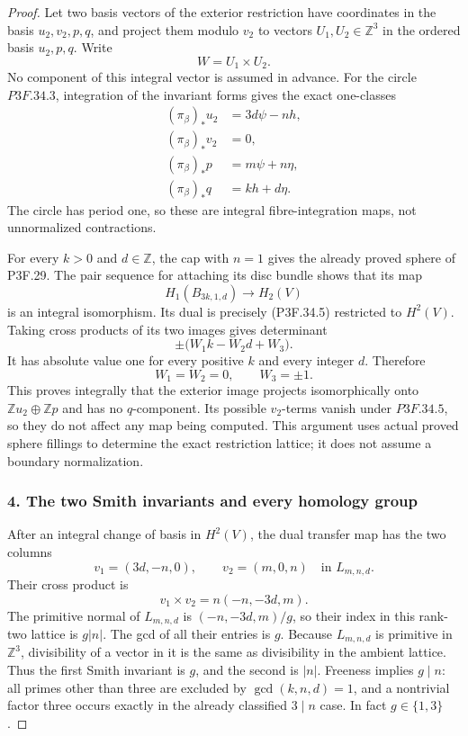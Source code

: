 \begin{proof}
Let two basis vectors of the exterior restriction have coordinates in the basis \(u_2,v_2,p,q\), and project them modulo \(v_2\) to vectors \(U_1,U_2\in\mathbb Z^3\) in the ordered basis \(u_2,p,q\). Write \[
                       W=U_1\times U_2.
\] No component of this integral vector is assumed in advance. For the circle \(P3F.34.3\), integration of the invariant forms gives the exact one-classes \[
 \begin{aligned}
 (\pi_\beta)_*u_2&=3d\psi-nh,\\
 (\pi_\beta)_*v_2&=0,\\
 (\pi_\beta)_*p&=m\psi+n\eta,\\
 (\pi_\beta)_*q&=kh+d\eta.
 \end{aligned}                                      \tag{P3F.34.5}
\] The circle has period one, so these are integral fibre-integration maps, not unnormalized contractions.

For every \(k>0\) and \(d\in\mathbb Z\), the cap with \(n=1\) gives the already proved sphere of P3F.29. The pair sequence for attaching its disc bundle shows that its map \[
 H_1(B_{3k,1,d})\longrightarrow H_2(V)
\] is an integral isomorphism. Its dual is precisely (P3F.34.5) restricted to \(H^2(V)\). Taking cross products of its two images gives determinant \[
                 \pm\bigl(W_1 k-W_2d+W_3\bigr).
\] It has absolute value one for every positive \(k\) and every integer \(d\). Therefore \[
                   W_1=W_2=0,\qquad W_3=\pm1.
\] This proves integrally that the exterior image projects isomorphically onto \(\mathbb Z u_2\oplus\mathbb Z p\) and has no \(q\)-component. Its possible \(v_2\)-terms vanish under \(P3F.34.5\), so they do not affect any map being computed. This argument uses actual proved sphere fillings to determine the exact restriction lattice; it does not assume a boundary normalization.

\subsubsection{4. The two Smith invariants and every homology group}\label{the-two-smith-invariants-and-every-homology-group}

After an integral change of basis in \(H^2(V)\), the dual transfer map has the two columns \[
       v_1=(3d,-n,0),\qquad v_2=(m,0,n)
                 \quad\text{in }L_{m,n,d}.            \tag{P3F.34.6}
\] Their cross product is \[
              v_1\times v_2=n(-n,-3d,m).
\] The primitive normal of \(L_{m,n,d}\) is \((-n,-3d,m)/g\), so their index in this rank-two lattice is \(g|n|\). The gcd of all their entries is \(g\). Because \(L_{m,n,d}\) is primitive in \(\mathbb Z^3\), divisibility of a vector in it is the same as divisibility in the ambient lattice. Thus the first Smith invariant is \(g\), and the second is \(|n|\). Freeness implies \(g\mid n\): all primes other than three are excluded by \(\gcd(k,n,d)=1\), and a nontrivial factor three occurs exactly in the already classified \(3\mid n\) case. In fact \(g\in\{1,3\}\).


\end{proof}
